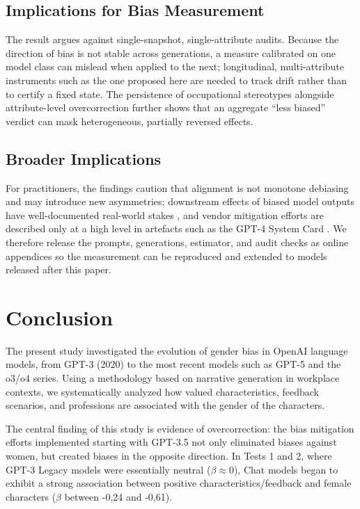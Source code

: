\documentclass[jair,11pt,letterpaper]{article}
\begin{document}
\subsection{Implications for Bias Measurement}
The result argues against single-snapshot, single-attribute audits. Because the
direction of bias is not stable across generations, a measure calibrated on one
model class can mislead when applied to the next; longitudinal, multi-attribute
instruments such as the one proposed here are needed to track drift rather than
to certify a fixed state. The persistence of occupational stereotypes alongside
attribute-level overcorrection further shows that an aggregate ``less biased''
verdict can mask heterogeneous, partially reversed effects.

\subsection{Broader Implications}
For practitioners, the findings caution that alignment is not monotone debiasing
and may introduce new asymmetries; downstream effects of biased model outputs
have well-documented real-world stakes , and vendor
mitigation efforts are described only at a high level in artefacts such as the
GPT-4 System Card . We therefore release the prompts,
generations, estimator, and audit checks as online appendices so the measurement
can be reproduced and extended to models released after this paper.

\section{Conclusion}


The present study investigated the evolution of gender bias in OpenAI
language models, from GPT-3 (2020) to the most recent models
such as GPT-5 and the o3/o4 series. Using a methodology based on
narrative generation in workplace contexts, we systematically analyzed
how valued characteristics, feedback scenarios,
and professions are associated with the gender of the characters.

The central finding of this study is evidence of overcorrection: the
bias mitigation efforts implemented starting with GPT-3.5 not
only eliminated biases against women, but created biases in the opposite
direction. In Tests 1 and 2, where GPT-3 Legacy models were essentially
neutral ($\beta \approx 0$), Chat models began to exhibit a strong association
between positive characteristics/feedback and female characters ($\beta$
between -0,24 and -0,61).
\end{document}
